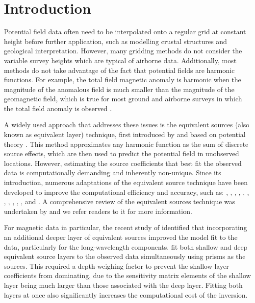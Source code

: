 \newcommand{\norm}[1]{\left\lVert#1\right\rVert}
\newcommand{\vecbf}[1]{\vec{\mathbf{#1}}}


\section{Introduction}

Potential field data often need to be interpolated onto a regular grid at constant height before further application, such as modelling crustal structures and geological interpretation. However, many gridding methods do not consider the variable survey heights which are typical of airborne data. Additionally, most methods do not take advantage of the fact that potential fields are harmonic functions. For example, the total field magnetic anomaly is harmonic when the magnitude of the anomalous field is much smaller than the magnitude of the geomagnetic field, which is true for most ground and airborne surveys in which the total field anomaly is observed \citep{Blakley1995}.

A widely used approach that addresses these issues is the equivalent sources (also known as equivalent layer) technique, first introduced by \citet{Dampney1969} and based on potential theory \citep{Kellogg1967}. This method approximates any harmonic function as the sum of discrete source effects, which are then used to predict the potential field in unobserved locations. However, estimating the source coefficients that best fit the observed data is computationally demanding and inherently non-unique. Since its introduction, numerous adaptations of the equivalent source technique have been developed to improve the computational efficiency and accuracy, such as: \citet{Leao1989}, \citet{Cordell1992}, \citet{Mendona1994}, \citet{Guspi2009}, \citet{Li2010}, \citet{OliveiraJr2013}, \citet{Siqueira2017}, \citet{Jirigalatu2019}, \citet{Mendona2020}, \citet{Li2020}, \citet{Soler2021}, \citet{Takahashi2022} and \citet{Piauilino2024}. A comprehensive review of the equivalent sources technique was undertaken by \citet{OliveiraJr2023} and we refer readers to it for more information.

For magnetic data in particular, the recent study of \citet{Li2020} identified that incorporating an additional deeper layer of equivalent sources improved the model fit to the data, particularly for the long-wavelength components. \citet{Li2020} fit both shallow and deep equivalent source layers to the observed data simultaneously using prisms as the sources. This required a depth-weighing factor to prevent the shallow layer coefficients from dominating, due to the sensitivity matrix elements of the shallow layer being much larger than those associated with the deep layer. Fitting both layers at once also significantly increases the computational cost of the inversion.


